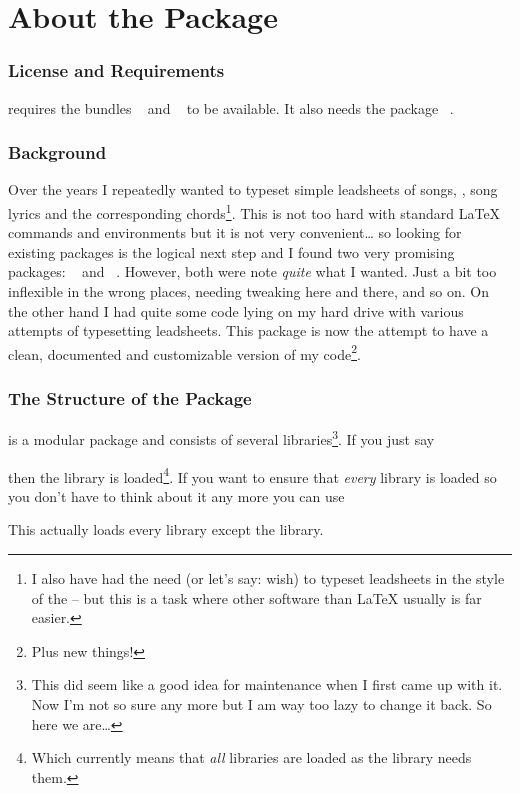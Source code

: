 \documentclass[load-preamble+]{cnltx-doc}
\def\library*#1{``#1''}%
\begin{document}
\part{About the Package}

\section{License and Requirements}

\license

\leadsheets{} requires the bundles ~\cite{bnd:l3kernel} and
~\cite{bnd:l3packages}  to be available.  It also needs the
package ~\cite{pkg:translations}.

\section{Background}

Over the years I repeatedly wanted to typeset simple leadsheets of songs, \ie,
song lyrics and the corresponding chords\footnote{I also have had the need (or
  let's say: wish) to typeset leadsheets in the style of the
   -- but this is a task where other software than
  \LaTeX{} usually is far easier.}.  This is not too hard with standard
\LaTeX{} commands and environments but it is not very convenient\ldots{} so
looking for existing packages is the logical next step and I found two very
promising packages: ~\cite{pkg:songs} and
~\cite{pkg:songbook}.  However, both were note \emph{quite} what
I wanted.  Just a bit too inflexible in the wrong places, needing tweaking
here and there, and so on.  On the other hand I had quite some code lying on
my hard drive with various attempts of typesetting leadsheets.  This package
is now the attempt to have a clean, documented and customizable version of my
code\footnote{Plus new things!}.

\section{The Structure of the Package}
\leadsheets{} is a modular package and consists of several
libraries\footnote{This did seem like a good idea for maintenance when I first
  came up with it.  Now I'm not so sure any more but I am way too lazy to
  change it back.  So here we are\ldots}.  If you just say
\begin{sourcecode}
  \usepackage{leadsheets}
\end{sourcecode}
then the  library is loaded\footnote{Which currently means that
  \emph{all} libraries are loaded as the  library needs them.}.
If you want to ensure that \emph{every} library is loaded
so you don't have to think about it any more you can use
\begin{sourcecode}
  \usepackage[full]{leadsheets}
\end{sourcecode}
This actually loads every library except the  library.
\end{document}
